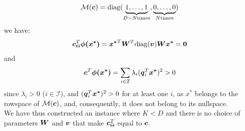 \documentclass{exam}
\begin{document}
\begin{questions}
        \[
            \mathcal{M}(\vb*{c}) = \text{diag}(\underbrace{1, \dots, 1}_{D - N \text{times}}, \underbrace{0, \dots, 0}_{N \text{times}}) 
        \]
        we have:
        \[
            \vb*{c}^T_{\Theta} \vb*{\phi(x^*)}
            = \vb*{x^*}^T \vb*{W}^T \text{diag}(\vb*{v}) \vb*{Wx^*} = \vb*{0}
        \]
        and
        \[
            \vb*{c}^T \vb*{\phi(x^*)} = \sum_{i \in \mathcal{I}} \lambda_i (\vb*{q}_i^T\vb*{x^*})^2 > 0
        \]
        since $\lambda_i > 0$ ($i \in \mathcal{I}$), and $(\vb*{q}_i^T\vb*{x^*})^2 > 0$ for at least one $i$, as $x^*$ belongs to the rowspace of $ \mathcal{M}(\vb*{c})$, and, consequently, it does not belong to its nullspace.\\
        We have thus constructed an instance where $K < D$ and there is no choice of parameters $\vb*{W}$ and $\vb*{v}$ that make $\vb*{c}^T_{\Theta}$ equal to $\vb*{c}$.
        \question
    \end{questions}
\end{document}
